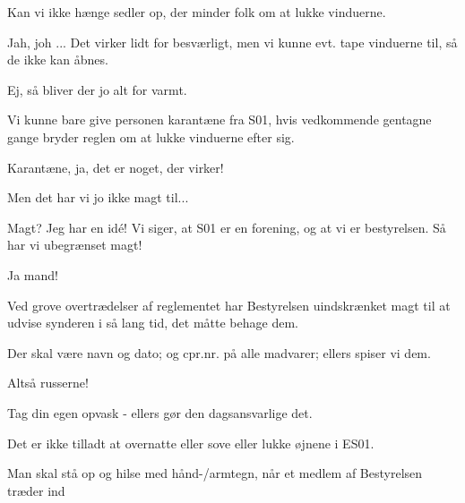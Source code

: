 \documentclass[a4paper,11pt]{article}
\begin{document}
\begin{sketch}
 Kan vi ikke hænge sedler op, der minder folk om at lukke vinduerne.

 Jah, joh ... Det virker lidt for besværligt, men vi kunne evt. tape vinduerne til, så de ikke kan åbnes.

 Ej, så bliver der jo alt for varmt.

 Vi kunne bare give personen karantæne fra S01, hvis vedkommende gentagne gange bryder reglen om at lukke vinduerne efter sig.

 Karantæne, ja, det er noget, der virker!


 Men det har vi jo ikke magt til...


 Magt? Jeg har en idé! Vi siger, at S01 er en forening, og at vi er bestyrelsen. Så har vi ubegrænset magt!



 Ja mand!



  Ved grove overtrædelser af reglementet har Bestyrelsen uindskrænket magt til at udvise synderen i så lang tid, det måtte behage dem. 

  Der skal være navn og dato; og cpr.nr. på alle madvarer; ellers spiser vi dem. 

 Altså russerne!

  Tag din egen opvask - ellers gør den dagsansvarlige det. 


  Det er ikke tilladt at overnatte eller sove eller lukke øjnene i ES01. 


  Man skal stå op og hilse med hånd-/armtegn, når et medlem af Bestyrelsen træder ind 


\end{sketch}
\end{document}
